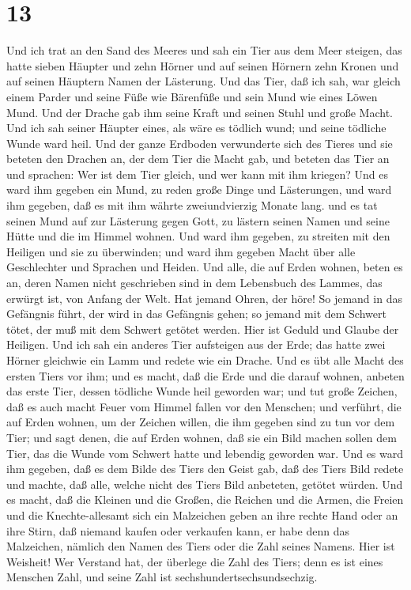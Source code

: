 \hypertarget{section-12}{%
\section{13}\label{section-12}}

 Und ich trat an den Sand des Meeres und sah ein Tier aus
dem Meer steigen, das hatte sieben Häupter und zehn Hörner und auf
seinen Hörnern zehn Kronen und auf seinen Häuptern Namen der Lästerung.
 Und das Tier, daß ich sah, war gleich einem Parder und
seine Füße wie Bärenfüße und sein Mund wie eines Löwen Mund. Und der
Drache gab ihm seine Kraft und seinen Stuhl und große Macht.
 Und ich sah seiner Häupter eines, als wäre es tödlich wund;
und seine tödliche Wunde ward heil. Und der ganze Erdboden verwunderte
sich des Tieres  und sie beteten den Drachen an, der dem
Tier die Macht gab, und beteten das Tier an und sprachen: Wer ist dem
Tier gleich, und wer kann mit ihm kriegen?  Und es ward ihm
gegeben ein Mund, zu reden große Dinge und Lästerungen, und ward ihm
gegeben, daß es mit ihm währte zweiundvierzig Monate lang. 
und es tat seinen Mund auf zur Lästerung gegen Gott, zu lästern seinen
Namen und seine Hütte und die im Himmel wohnen.  Und ward
ihm gegeben, zu streiten mit den Heiligen und sie zu überwinden; und
ward ihm gegeben Macht über alle Geschlechter und Sprachen und Heiden.
 Und alle, die auf Erden wohnen, beten es an, deren Namen
nicht geschrieben sind in dem Lebensbuch des Lammes, das erwürgt ist,
von Anfang der Welt.  Hat jemand Ohren, der höre!
 So jemand in das Gefängnis führt, der wird in das
Gefängnis gehen; so jemand mit dem Schwert tötet, der muß mit dem
Schwert getötet werden. Hier ist Geduld und Glaube der Heiligen.
 Und ich sah ein anderes Tier aufsteigen aus der Erde; das
hatte zwei Hörner gleichwie ein Lamm und redete wie ein Drache.
 Und es übt alle Macht des ersten Tiers vor ihm; und es
macht, daß die Erde und die darauf wohnen, anbeten das erste Tier,
dessen tödliche Wunde heil geworden war;  und tut große
Zeichen, daß es auch macht Feuer vom Himmel fallen vor den Menschen;
 und verführt, die auf Erden wohnen, um der Zeichen willen,
die ihm gegeben sind zu tun vor dem Tier; und sagt denen, die auf Erden
wohnen, daß sie ein Bild machen sollen dem Tier, das die Wunde vom
Schwert hatte und lebendig geworden war.  Und es ward ihm
gegeben, daß es dem Bilde des Tiers den Geist gab, daß des Tiers Bild
redete und machte, daß alle, welche nicht des Tiers Bild anbeteten,
getötet würden.  Und es macht, daß die Kleinen und die
Großen, die Reichen und die Armen, die Freien und die Knechte-allesamt
sich ein Malzeichen geben an ihre rechte Hand oder an ihre Stirn,
 daß niemand kaufen oder verkaufen kann, er habe denn das
Malzeichen, nämlich den Namen des Tiers oder die Zahl seines Namens.
 Hier ist Weisheit! Wer Verstand hat, der überlege die Zahl
des Tiers; denn es ist eines Menschen Zahl, und seine Zahl ist
sechshundertsechsundsechzig.

